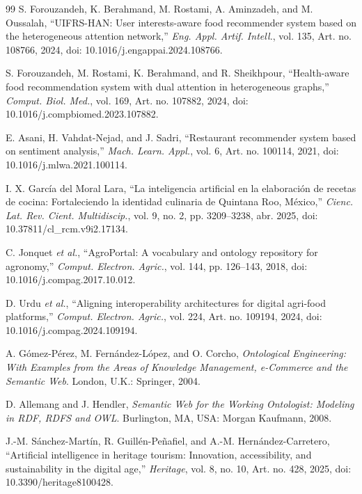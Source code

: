 \documentclass[conference]{IEEEtran}
\begin{document}
\begin{thebibliography}{99}
 S. Forouzandeh, K. Berahmand, M. Rostami, A. Aminzadeh, and M. Oussalah, ``UIFRS-HAN: User interests-aware food recommender system based on the heterogeneous attention network,'' \emph{Eng. Appl. Artif. Intell.}, vol. 135, Art. no. 108766, 2024, doi: 10.1016/j.engappai.2024.108766.

 S. Forouzandeh, M. Rostami, K. Berahmand, and R. Sheikhpour, ``Health-aware food recommendation system with dual attention in heterogeneous graphs,'' \emph{Comput. Biol. Med.}, vol. 169, Art. no. 107882, 2024, doi: 10.1016/j.compbiomed.2023.107882.

 E. Asani, H. Vahdat-Nejad, and J. Sadri, ``Restaurant recommender system based on sentiment analysis,'' \emph{Mach. Learn. Appl.}, vol. 6, Art. no. 100114, 2021, doi: 10.1016/j.mlwa.2021.100114.

 I. X. García del Moral Lara, ``La inteligencia artificial en la elaboración de recetas de cocina: Fortaleciendo la identidad culinaria de Quintana Roo, México,'' \emph{Cienc. Lat. Rev. Cient. Multidiscip.}, vol. 9, no. 2, pp. 3209--3238, abr. 2025, doi: 10.37811/cl\_rcm.v9i2.17134.

 C. Jonquet \emph{et al.}, ``AgroPortal: A vocabulary and ontology repository for agronomy,'' \emph{Comput. Electron. Agric.}, vol. 144, pp. 126--143, 2018, doi: 10.1016/j.compag.2017.10.012.

 D. Urdu \emph{et al.}, ``Aligning interoperability architectures for digital agri-food platforms,'' \emph{Comput. Electron. Agric.}, vol. 224, Art. no. 109194, 2024, doi: 10.1016/j.compag.2024.109194.

 A. Gómez-Pérez, M. Fernández-López, and O. Corcho, \emph{Ontological Engineering: With Examples from the Areas of Knowledge Management, e-Commerce and the Semantic Web}. London, U.K.: Springer, 2004.

 D. Allemang and J. Hendler, \emph{Semantic Web for the Working Ontologist: Modeling in RDF, RDFS and OWL}. Burlington, MA, USA: Morgan Kaufmann, 2008.

 J.-M. Sánchez-Martín, R. Guillén-Peñafiel, and A.-M. Hernández-Carretero, ``Artificial intelligence in heritage tourism: Innovation, accessibility, and sustainability in the digital age,'' \emph{Heritage}, vol. 8, no. 10, Art. no. 428, 2025, doi: 10.3390/heritage8100428.


\end{thebibliography}
\end{document}
